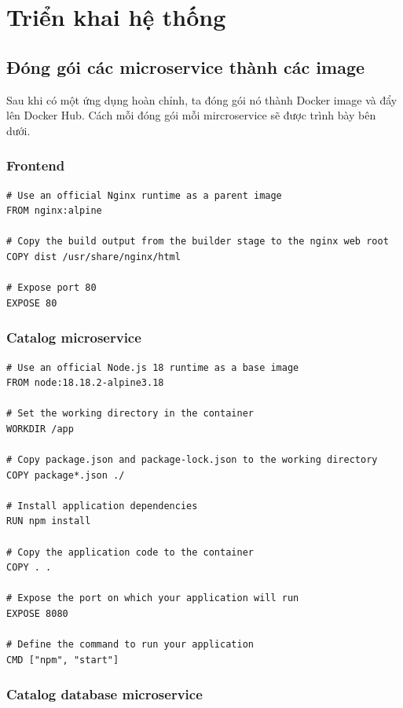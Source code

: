 \section{Triển khai hệ thống}
\subsection{Đóng gói các microservice thành các image}
\noindent Sau khi có một ứng dụng hoàn chỉnh, ta đóng gói nó thành Docker image và đẩy lên Docker Hub. Cách mỗi đóng gói mỗi mircroservice sẽ được trình bày bên dưới.

\subsubsection*{Frontend}

\begin{lstlisting}[language=docker]
# Use an official Nginx runtime as a parent image
FROM nginx:alpine
  
# Copy the build output from the builder stage to the nginx web root
COPY dist /usr/share/nginx/html
  
# Expose port 80
EXPOSE 80
\end{lstlisting}

\subsubsection*{Catalog microservice}

\begin{lstlisting}[language=docker]
# Use an official Node.js 18 runtime as a base image
FROM node:18.18.2-alpine3.18

# Set the working directory in the container
WORKDIR /app

# Copy package.json and package-lock.json to the working directory
COPY package*.json ./

# Install application dependencies
RUN npm install

# Copy the application code to the container
COPY . .

# Expose the port on which your application will run
EXPOSE 8080

# Define the command to run your application
CMD ["npm", "start"]
\end{lstlisting}

\subsubsection*{Catalog database microservice}

